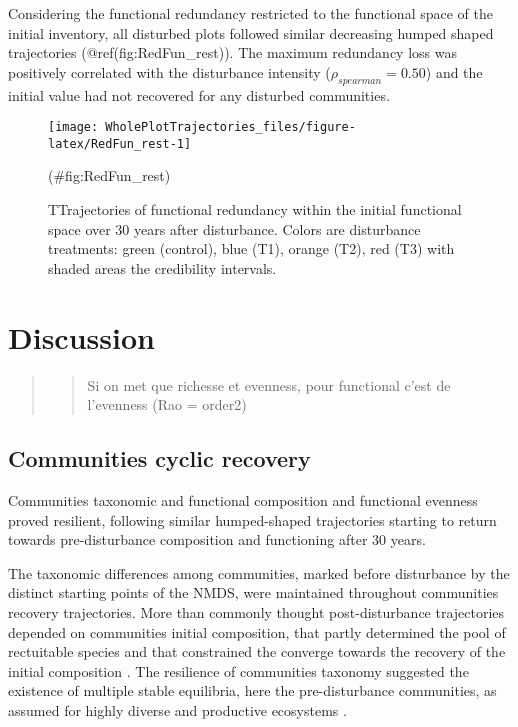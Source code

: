 \documentclass[fleqn,10pt]{ArtEcoFoG} %
\theoremstyle{definition}
\theoremstyle{definition}
\theoremstyle{definition}
\theoremstyle{remark}
\begin{document}
Considering the functional redundancy restricted to the functional space
of the initial inventory, all disturbed plots followed similar
decreasing humped shaped trajectories (@ref(fig:RedFun\_rest)). The
maximum redundancy loss was positively correlated with the disturbance
intensity (\(\rho_{spearman}=0.50\)) and the initial value had not
recovered for any disturbed communities.

\begin{figure}

{\centering \texttt{[image: WholePlotTrajectories\_files/figure-latex/RedFun\_rest-1]} 

}

\caption{TTrajectories of functional redundancy within the initial functional space over 30 years after disturbance. Colors are disturbance treatments: green (control), blue (T1), orange (T2), red (T3) with shaded areas the credibility intervals.}(\#fig:RedFun_rest)
\end{figure}

\section{Discussion}\label{discussion}

\begin{quote}
\begin{quote}
Si on met que richesse et evenness, pour functional c'est de l'evenness
(Rao = order2)
\end{quote}
\end{quote}

\subsection{Communities cyclic
recovery}\label{communities-cyclic-recovery}

Communities taxonomic and functional composition and functional evenness
proved resilient, following similar humped-shaped trajectories starting
to return towards pre-disturbance composition and functioning after 30
years.

The taxonomic differences among communities, marked before disturbance
by the distinct starting points of the NMDS, were maintained throughout
communities recovery trajectories. More than commonly thought
post-disturbance trajectories depended on communities initial
composition, that partly determined the pool of rectuitable species and
that constrained the converge towards the recovery of the initial
composition
\citep{Hubbell1999, Molino2001, Anderson2007, Baraloto2012a}. The
resilience of communities taxonomy suggested the existence of multiple
stable equilibria, here the pre-disturbance communities, as assumed for
highly diverse and productive ecosystems \citep{Chase2003}.
\end{document}
